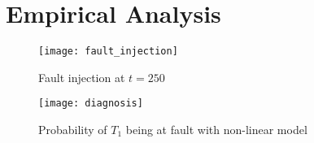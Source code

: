 \section{Empirical Analysis}
%
\begin{figure}[htb]
  \centering
  \texttt{[image: fault\_injection]}
  \caption{Fault injection at $t = 250$}
  \label{fig:fault_injection}
\end{figure}
\par\noindent
%
\begin{figure}[htb]
  \centering
  \texttt{[image: diagnosis]}
  \caption{Probability of $T_1$ being at fault with non-linear model}
  \label{fig:diagnosis}
\end{figure}
\par\noindent

